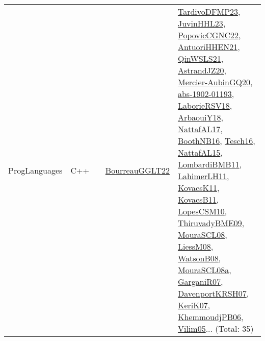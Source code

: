 {\begin{longtable}{lp{3cm}>{\raggedright}p{6cm}>{\raggedright}p{6cm}p{8cm}}
ProgLanguages & C++ &  & \href{articles/BourreauGGLT22.pdf}{BourreauGGLT22}\cite{BourreauGGLT22} & \href{papers/TardivoDFMP23.pdf}{TardivoDFMP23}\cite{TardivoDFMP23}, \href{papers/JuvinHHL23.pdf}{JuvinHHL23}\cite{JuvinHHL23}, \href{papers/PopovicCGNC22.pdf}{PopovicCGNC22}\cite{PopovicCGNC22}, \href{papers/AntuoriHHEN21.pdf}{AntuoriHHEN21}\cite{AntuoriHHEN21}, \href{articles/QinWSLS21.pdf}{QinWSLS21}\cite{QinWSLS21}, \href{articles/AstrandJZ20.pdf}{AstrandJZ20}\cite{AstrandJZ20}, \href{papers/Mercier-AubinGQ20.pdf}{Mercier-AubinGQ20}\cite{Mercier-AubinGQ20}, \href{articles/abs-1902-01193.pdf}{abs-1902-01193}\cite{abs-1902-01193}, \href{articles/LaborieRSV18.pdf}{LaborieRSV18}\cite{LaborieRSV18}, \href{papers/ArbaouiY18.pdf}{ArbaouiY18}\cite{ArbaouiY18}, \href{articles/NattafAL17.pdf}{NattafAL17}\cite{NattafAL17}, \href{papers/BoothNB16.pdf}{BoothNB16}\cite{BoothNB16}, \href{papers/Tesch16.pdf}{Tesch16}\cite{Tesch16}, \href{articles/NattafAL15.pdf}{NattafAL15}\cite{NattafAL15}, \href{papers/LombardiBMB11.pdf}{LombardiBMB11}\cite{LombardiBMB11}, \href{papers/LahimerLH11.pdf}{LahimerLH11}\cite{LahimerLH11}, \href{articles/KovacsK11.pdf}{KovacsK11}\cite{KovacsK11}, \href{articles/KovacsB11.pdf}{KovacsB11}\cite{KovacsB11}, \href{articles/LopesCSM10.pdf}{LopesCSM10}\cite{LopesCSM10}, \href{papers/ThiruvadyBME09.pdf}{ThiruvadyBME09}\cite{ThiruvadyBME09}, \href{papers/MouraSCL08.pdf}{MouraSCL08}\cite{MouraSCL08}, \href{articles/LiessM08.pdf}{LiessM08}\cite{LiessM08}, \href{papers/WatsonB08.pdf}{WatsonB08}\cite{WatsonB08}, \href{papers/MouraSCL08a.pdf}{MouraSCL08a}\cite{MouraSCL08a}, \href{papers/GarganiR07.pdf}{GarganiR07}\cite{GarganiR07}, \href{papers/DavenportKRSH07.pdf}{DavenportKRSH07}\cite{DavenportKRSH07}, \href{papers/KeriK07.pdf}{KeriK07}\cite{KeriK07}, \href{papers/KhemmoudjPB06.pdf}{KhemmoudjPB06}\cite{KhemmoudjPB06}, \href{papers/Vilim05.pdf}{Vilim05}\cite{Vilim05}... (Total: 35)\\

\end{longtable}}
